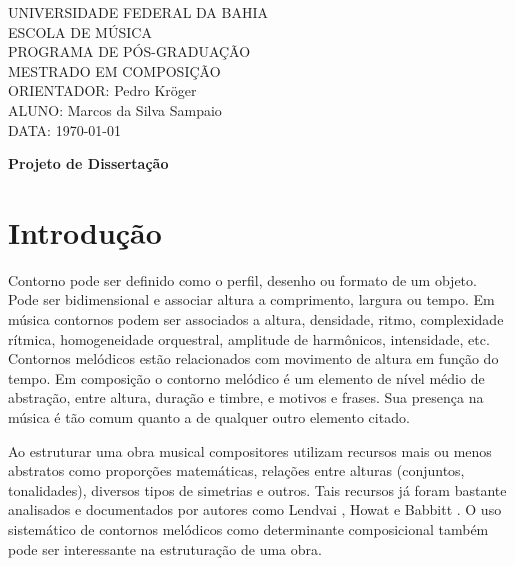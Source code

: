 \documentclass{article}
\begin{document}
\setlength{\parindent}{0cm}

\large
UNIVERSIDADE FEDERAL DA BAHIA \\
ESCOLA DE MÚSICA \\
PROGRAMA DE PÓS-GRADUAÇÃO \\
MESTRADO EM COMPOSIÇÃO \\
ORIENTADOR: Pedro Kröger \\
ALUNO: Marcos da Silva Sampaio \\
DATA: \today

\thispagestyle{empty}
\vspace{1cm}
\begin{center}
  {\Huge \textbf{Projeto de Dissertação}}
\end{center}
\vspace{1cm}

\section{Introdução}
\label{sec:introducao}

Contorno pode ser definido como o perfil, desenho ou formato de um
objeto. Pode ser bidimensional e associar altura a comprimento,
largura ou tempo. Em música contornos podem ser associados a altura,
densidade, ritmo, complexidade rítmica, homogeneidade orquestral,
amplitude de harmônicos, intensidade, etc. Contornos melódicos estão
relacionados com movimento de altura em função do tempo.
Em composição o contorno melódico é um elemento de nível médio de
abstração, entre altura, duração e timbre, e motivos e frases. Sua
presença na música é tão comum quanto a de qualquer outro elemento
citado. 


Ao estruturar uma obra musical compositores utilizam recursos mais ou
menos abstratos como proporções matemáticas, relações entre alturas
(conjuntos, tonalidades), diversos tipos de simetrias e outros. Tais
recursos já foram bastante analisados e documentados por autores como
Lendvai \cite{Lendvai1971}, Howat \cite{Howat1983} e Babbitt
\cite{babbitt1961ssc}. O uso sistemático de contornos melódicos como
determinante composicional também pode ser interessante na
estruturação de uma obra.

\end{document}
